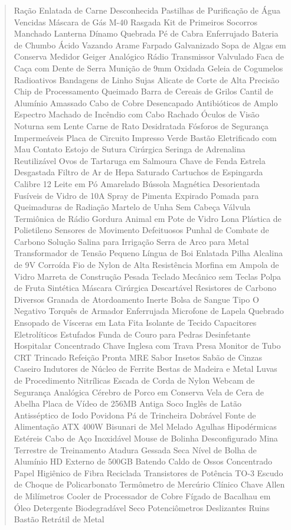\documentclass[12pt,a4paper]{article}
\begin{document}
\begin{quote}
\obeylines
Ração Enlatada de Carne Desconhecida
Pastilhas de Purificação de Água Vencidas
Máscara de Gás M-40 Rasgada
Kit de Primeiros Socorros Manchado
Lanterna Dínamo Quebrada
Pé de Cabra Enferrujado
Bateria de Chumbo Ácido Vazando
Arame Farpado Galvanizado
Sopa de Algas em Conserva
Medidor Geiger Analógico
Rádio Transmissor Valvulado
Faca de Caça com Dente de Serra
Munição de 9mm Oxidada
Geleia de Cogumelos Radioativos
Bandagens de Linho Sujas
Alicate de Corte de Alta Precisão
Chip de Processamento Queimado
Barra de Cereais de Grilos
Cantil de Alumínio Amassado
Cabo de Cobre Desencapado
Antibióticos de Amplo Espectro
Machado de Incêndio com Cabo Rachado
Óculos de Visão Noturna sem Lente
Carne de Rato Desidratada
Fósforos de Segurança Impermeáveis
Placa de Circuito Impresso Verde
Bastão Eletrificado com Mau Contato
Estojo de Sutura Cirúrgica
Seringa de Adrenalina Reutilizável
Ovos de Tartaruga em Salmoura
Chave de Fenda Estrela Desgastada
Filtro de Ar de Hepa Saturado
Cartuchos de Espingarda Calibre 12
Leite em Pó Amarelado
Bússola Magnética Desorientada
Fusíveis de Vidro de 10A
Spray de Pimenta Expirado
Pomada para Queimaduras de Radiação
Martelo de Unha Sem Cabeça
Válvula Termiônica de Rádio
Gordura Animal em Pote de Vidro
Lona Plástica de Polietileno
Sensores de Movimento Defeituosos
Punhal de Combate de Carbono
Solução Salina para Irrigação
Serra de Arco para Metal
Transformador de Tensão Pequeno
Língua de Boi Enlatada
Pilha Alcalina de 9V Corroída
Fio de Nylon de Alta Resistência
Morfina em Ampola de Vidro
Marreta de Construção Pesada
Teclado Mecânico sem Teclas
Polpa de Fruta Sintética
Máscara Cirúrgica Descartável
Resistores de Carbono Diversos
Granada de Atordoamento Inerte
Bolsa de Sangue Tipo O Negativo
Torquês de Armador Enferrujada
Microfone de Lapela Quebrado
Ensopado de Vísceras em Lata
Fita Isolante de Tecido
Capacitores Eletrolíticos Estufados
Funda de Couro para Pedras
Desinfetante Hospitalar Concentrado
Chave Inglesa com Trava Presa
Monitor de Tubo CRT Trincado
Refeição Pronta MRE Sabor Insetos
Sabão de Cinzas Caseiro
Indutores de Núcleo de Ferrite
Bestas de Madeira e Metal
Luvas de Procedimento Nitrílicas
Escada de Corda de Nylon
Webcam de Segurança Analógica
Cérebro de Porco em Conserva
Vela de Cera de Abelha
Placa de Vídeo de 256MB Antiga
Soco Inglês de Latão
Antisséptico de Iodo Povidona
Pá de Trincheira Dobrável
Fonte de Alimentação ATX 400W
Bisunari de Mel Melado
Agulhas Hipodérmicas Estéreis
Cabo de Aço Inoxidável
Mouse de Bolinha Desconfigurado
Mina Terrestre de Treinamento
Atadura Gessada Seca
Nível de Bolha de Alumínio
HD Externo de 500GB Batendo
Caldo de Ossos Concentrado
Papel Higiênico de Fibra Reciclada
Transistores de Potência TO-3
Escudo de Choque de Policarbonato
Termômetro de Mercúrio Clínico
Chave Allen de Milímetros
Cooler de Processador de Cobre
Fígado de Bacalhau em Óleo
Detergente Biodegradável Seco
Potenciômetros Deslizantes Ruins
Bastão Retrátil de Metal
\end{quote}
\end{document}

